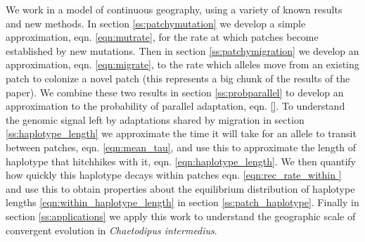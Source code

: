 \documentclass{article}
\begin{document}
We work in a model of continuous geography,
using a variety of known results and new methods.
In section \ref{ss:patchymutation} we develop a simple approximation,
eqn. \eqref{eqn:mutrate}, for the rate at which patches become
established by new mutations. Then in section \ref{ss:patchymigration} we
develop an approximation, eqn. \eqref{eqn:migrate}, to the rate which alleles move from an
existing patch to colonize a novel patch (this represents a big chunk
of the results of the paper). We combine these two results in section
\ref{ss:probparallel} to develop an approximation to the probability of
parallel adaptation, eqn. \eqref{}.
To understand the genomic signal left by adaptations shared by
migration in section \ref{ss:haplotype_length} we approximate the time
it will take for an allele to transit between patches,
eqn. \eqref{eqn:mean_tau}, and use this to approximate the length of
haplotype that hitchhikes with it,
eqn. \eqref{eqn:haplotype_length}. We then quantify how quickly this
haplotype decays within patches eqn. \eqref{eqn:rec_rate_within } and
use this to obtain properties about the equilibrium distribution of
haplotype lengths
\eqref{eqn:within_haplotype_length}  in section \ref{ss:patch_haplotype}. 
Finally in section \ref{ss:applications} we apply this work to understand the geographic scale of
convergent evolution in \textit{Chaetodipus intermedius}. 







\end{document}

